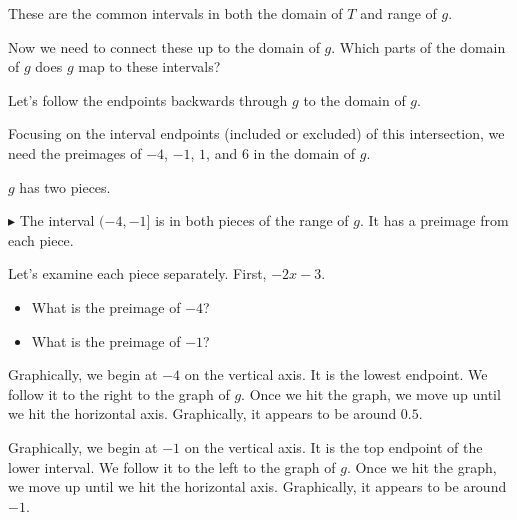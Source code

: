 \documentclass{ximera}
\begin{document}
These are the common intervals in both the domain of $T$ and range of $g$.   

Now we need to connect these up to the domain of $g$.  Which parts of the domain of $g$ does $g$ map to these intervals?

Let's follow the endpoints backwards through $g$ to the domain of $g$.




Focusing on the interval endpoints (included or excluded) of this intersection, we need the preimages of $-4$, $-1$, $1$, and $6$ in the domain of $g$.  


$g$ has two pieces. 









$\blacktriangleright$ The interval $(-4, -1]$ is in both pieces of the range of $g$.  It has a preimage from each piece. 


Let's examine each piece separately.  First, $-2x - 3$. 


\begin{itemize}
\item What is the preimage of $-4$? 
\item What is the preimage of $-1$? 
\end{itemize}



Graphically, we begin at $-4$ on the vertical axis.  It is the lowest endpoint.  We follow it to the right to the graph of $g$.  Once we hit the graph, we move up until we hit the horizontal axis.  Graphically, it appears to be around $0.5$.


Graphically, we begin at $-1$ on the vertical axis.  It is the top endpoint of the lower interval.  We follow it to the left to the graph of $g$.  Once we hit the graph, we move up until we hit the horizontal axis.  Graphically, it appears to be around $-1$.
\end{document}
